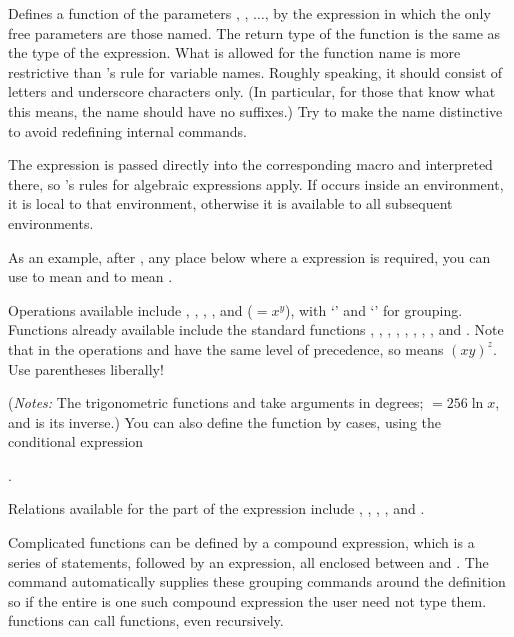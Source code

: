 \documentclass[letterpaper]{article}
\begin{document}
Defines a \MF{} function  of the parameters ,
, $\ldots$, by the \MF{} expression  in which
the only free parameters are those named.  The return type of the
function is the same as the type of the expression. What is allowed for
the function name  is more restrictive than \MF{}'s rule for
variable names. Roughly speaking, it should consist of letters and
underscore characters only. (In particular, for those that know what
this means, the name should have no suffixes.) Try to make the name
distinctive to avoid redefining internal \MF{} commands.

The expression  is passed directly into the corresponding
\MF{} macro and interpreted there, so \MF{}'s rules for algebraic
expressions apply. If  occurs inside an 
environment, it is local to that environment, otherwise it is available
to all subsequent  environments.

As an example, after , any
place below where a \MF{} expression is required, you can use
 to mean  and  to mean
.

Operations available include \mfc{+}, \mfc{-}, \mfc{*}, \mfc{/}, and
\mfc{**} ($=x^y$), with `\mfc{(}' and `\mfc{)}' for grouping.
Functions already available include the standard \MF{} functions
, , , , ,
, , , and . Note that in \MF{}
the operations \mfc{*} and \mfc{**} have the same level of precedence,
so  means $(xy)^z$. Use parentheses liberally!

(\textit{Notes:} The \MF{} trigonometric functions  and
 take arguments in degrees; $=256\ln x$, and
 is its inverse.) You can also define the function 
by cases, using the \MF{} conditional expression
\begin{ex}
  .
\end{ex}
Relations available for the  part of the expression
include \mfc{=}, \mfc{<}, \mfc{>}, \mfc{<=}, \mfc{<>} and \mfc{>=}.

Complicated functions can be defined by a compound expression, which is
a series of \MF{} statements, followed by an expression, all enclosed
between  and . The  command
automatically supplies these grouping commands around the definition so
if the entire  is one such compound expression the user
need not type them. \CMF{} functions can call \MF{} functions, even
recursively.
\end{document}
